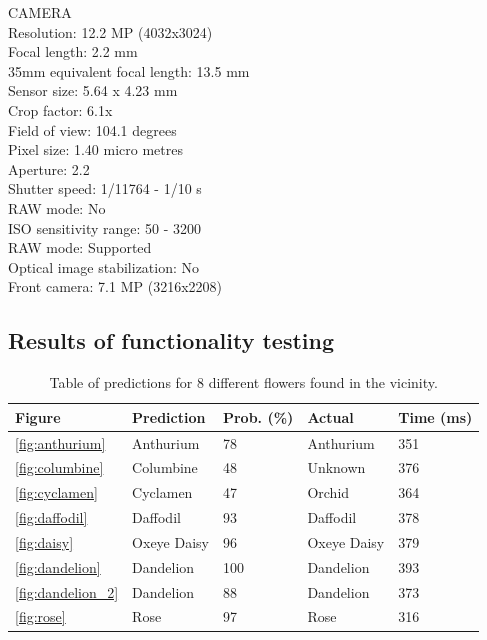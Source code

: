 \documentclass{article}
\begin{document}
\par

CAMERA \\
Resolution: 12.2 MP (4032x3024) \\
Focal length: 2.2 mm \\
35mm equivalent focal length: 13.5 mm \\
Sensor size: 5.64 x 4.23 mm \\ 
Crop factor: 6.1x \\
Field of view: 104.1 degrees \\
Pixel size: 1.40 micro metres \\
Aperture: 2.2 \\
Shutter speed: 1/11764 - 1/10 s \\
RAW mode: No \\
ISO sensitivity range: 50 - 3200 \\
RAW mode: Supported \\
Optical image stabilization: No \\
Front camera: 7.1 MP (3216x2208)

\subsection{Results of functionality testing}
\label{subsec:functionality}

\begin{table}[h!]
    \begin{tabular}{ |m{1cm}|m{2cm}|m{2cm}|m{2cm}|m{2cm}| }
        \hline
        Figure & Prediction & Prob. (\%) & Actual & Time (ms) \\
        \hline
        \ref{fig:anthurium} & Anthurium & 78 & Anthurium & 351 \\
        \hline
        \ref{fig:columbine} & Columbine & 48 & Unknown & 376 \\
        \hline
        \ref{fig:cyclamen} & Cyclamen & 47 & Orchid & 364 \\
        \hline
        \ref{fig:daffodil} & Daffodil & 93 & Daffodil & 378 \\
        \hline
        \ref{fig:daisy} & Oxeye Daisy & 96 & Oxeye Daisy & 379 \\
        \hline
        \ref{fig:dandelion} & Dandelion & 100 & Dandelion & 393 \\
        \hline
        \ref{fig:dandelion_2} & Dandelion & 88 & Dandelion & 373 \\
        \hline
        \ref{fig:rose} & Rose & 97 & Rose & 316 \\
        \hline
    \end{tabular}
    \caption{Table of predictions for 8 different flowers found in the vicinity.}
    \label{table:results}
\end{table}
\end{document}

